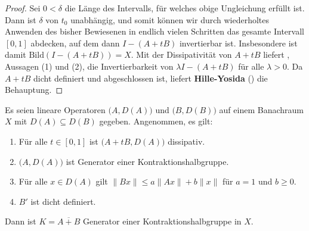 \begin{proof}


Sei $0<\delta$ die Länge des Intervalls, für welches obige Ungleichung erfüllt ist. Dann ist $\delta$ von $t_0$ unabhängig, und somit können wir durch wiederholtes Anwenden des bisher Bewiesenen in endlich vielen Schritten das gesamte Intervall $[0,1]$ abdecken, auf dem dann $I-(A+tB)$ invertierbar ist. Insbesondere ist damit $\text{Bild}(I-(A+tB))=X$. Mit der Dissipativität von $A+tB$ liefert , Aussagen (1) und (2), die Invertierbarkeit von $\lambda I-(A+tB)$ für alle $\lambda>0$.  Da $A+tB$ dicht definiert und abgeschlossen ist, liefert \textbf{Hille-Yosida} () die Behauptung.
\end{proof}

\begin{satz}\label{Störungstheorem dissipativer Operatoren 2}
Es seien lineare Operatoren $\big(A, D(A)\big)$ und $\big(B, D(B)\big)$ auf einem Banachraum $X$  mit $D(A)\subseteq D(B)$ gegeben. Angenommen, es gilt:
\begin{enumerate}
\item Für alle $t\in[0,1]$ ist $\big(A+tB, D(A)\big)$ dissipativ.
\item $\big(A, D(A)\big)$ ist Generator einer Kontraktionshalbgruppe.
\item Für alle $x\in D(A)$ gilt $\|Bx\|\leq a\|Ax\| + b\|x\|$ für  $a=1$ und $b\geq0$.
\item $B'$ ist dicht definiert.
\end{enumerate}
Dann ist $K=\overline{A+B}$ Generator einer Kontraktionshalbgruppe in $X$.
\end{satz}






